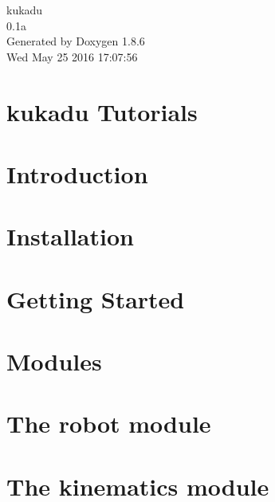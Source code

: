 \documentclass[twoside]{book}
\newcommand{\clearemptydoublepage}{%
  \newpage{\pagestyle{empty}\cleardoublepage}%
}
\begin{document}
\hypersetup{pageanchor=false}
\begin{titlepage}
\vspace*{7cm}
\begin{center}%
{\Large kukadu \\[1ex]\large 0.\-1a }\\
\vspace*{1cm}
{\large Generated by Doxygen 1.8.6}\\
\vspace*{0.5cm}
{\small Wed May 25 2016 17:07:56}\\
\end{center}
\end{titlepage}
\clearemptydoublepage
\tableofcontents
\clearemptydoublepage
{}
\hypersetup{pageanchor=true}

\chapter{kukadu Tutorials}
\label{index}\hypertarget{index}{}
\chapter{Introduction}
\label{introductionpage}
\hypertarget{introductionpage}{}

\chapter{Installation}
\label{installationpage}
\hypertarget{installationpage}{}

\chapter{Getting Started}
\label{gettingstartedpage}
\hypertarget{gettingstartedpage}{}

\chapter{Modules}
\label{modulespage}
\hypertarget{modulespage}{}

\chapter{The robot module}
\label{robotpage}
\hypertarget{robotpage}{}

\chapter{The kinematics module}
\label{kinematicspage}
\hypertarget{kinematicspage}{}

\end{document}
